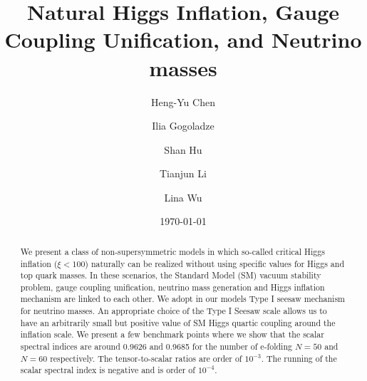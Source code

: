 \documentclass[aps,prd,preprint,superscriptaddress,showpacs,ctexart]{revtex4-1}
\begin{document}
\title{Natural Higgs Inflation, Gauge Coupling Unification, and Neutrino masses}

\author{Heng-Yu Chen}


\author{Ilia Gogoladze}


\author{Shan Hu}


\author{Tianjun Li}



\author{Lina Wu}



\date{\today}
\begin{abstract}
We present a class of non-supersymmetric models in which so-called critical Higgs inflation ($\xi<100$) naturally can be realized without using 
specific values for Higgs and top quark masses.
In  these scenarios,  the Standard Model (SM)  vacuum stability
problem, gauge coupling unification, neutrino mass generation and Higgs inflation mechanism
are linked to each other.  We adopt in our models Type I seesaw mechanism for neutrino
masses. An appropriate choice of the Type I Seesaw scale allows us to
have an arbitrarily small but positive value of SM Higgs quartic coupling
around the inflation scale.  We present
a few benchmark points where we show that the scalar spectral indices
are around 0.9626 and 0.9685 for the number of e-folding
$N=50$ and $N=60$ respectively. The tensor-to-scalar ratios are order
of $10^{-3}$. The running of the scalar spectral index is negative
and is order of $10^{-4}$.
\end{abstract}
\maketitle
\end{document}
